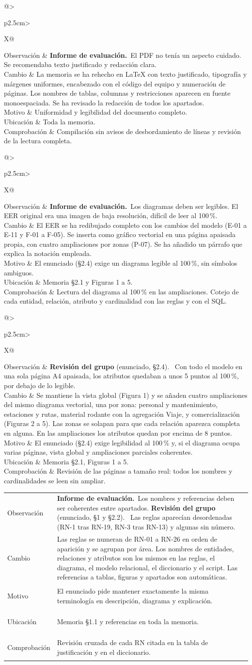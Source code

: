 \documentclass[11pt,a4paper]{article}
\makeatletter
\DeclareRobustCommand{\_}{\textunderscore\allowbreak}
\newcommand{\INF}{\textbf{Informe de evaluación.}~}
\newcommand{\REV}[1]{\textbf{Revisión del grupo} (enunciado, #1).~}
\newcommand{\cambio}[7]{%
\begin{tcolorbox}[colback=white,colframe=azuluvigo,colbacktitle=azuluvigo!8,coltitle=azuluvigo,
  title={\textbf{#1}\quad #2},fonttitle=\normalsize,boxrule=0.6pt,arc=1mm,
  left=2mm,right=2mm,top=1mm,bottom=1mm,before skip=6pt,after skip=6pt]
\small
\begin{tabularx}{\linewidth}{@{}>{\bfseries\raggedright\arraybackslash}p{2.5cm}>{\raggedright\arraybackslash}X@{}}
Observación & #3\\
Cambio & #4\\
Motivo & #5\\
Ubicación & #6\\
Comprobación & #7\\
\end{tabularx}
\end{tcolorbox}}
\makeatother
\begin{document}
\cambio{P-04}{Maquetación y redacción}
{\INF El PDF no tenía un aspecto cuidado. Se recomendaba texto justificado y redacción clara.}
{La memoria se ha rehecho en LaTeX con texto justificado, tipografía y márgenes uniformes, encabezado con el código del equipo y numeración de páginas. Los nombres de tablas, columnas y restricciones aparecen en fuente monoespaciada. Se ha revisado la redacción de todos los apartados.}
{Uniformidad y legibilidad del documento completo.}
{Toda la memoria.}
{Compilación sin avisos de desbordamiento de líneas y revisión de la lectura completa.}

\cambio{P-05}{Diagrama EER legible}
{\INF Los diagramas deben ser legibles. El EER original era una imagen de baja resolución, difícil de leer al 100\,\%.}
{El EER se ha redibujado completo con los cambios del modelo (E-01 a E-11 y F-01 a F-05). Se inserta como gráfico vectorial en una página apaisada propia, con cuatro ampliaciones por zonas (P-07). Se ha añadido un párrafo que explica la notación empleada.}
{El enunciado (§2.4) exige un diagrama legible al 100\,\%, sin símbolos ambiguos.}
{Memoria §2.1 y Figuras 1 a 5.}
{Lectura del diagrama al 100\,\% en las ampliaciones. Cotejo de cada entidad, relación, atributo y cardinalidad con las reglas y con el SQL.}

\cambio{P-07}{Ampliaciones del EER}
{\REV{§2.4} Con todo el modelo en una sola página A4 apaisada, los atributos quedaban a unos 5 puntos al 100\,\%, por debajo de lo legible.}
{Se mantiene la vista global (Figura 1) y se añaden cuatro ampliaciones del mismo diagrama vectorial, una por zona: personal y mantenimiento, estaciones y rutas, material rodante con la agregación Viaje, y comercialización (Figuras 2 a 5). Las zonas se solapan para que cada relación aparezca completa en alguna. En las ampliaciones los atributos quedan por encima de 8 puntos.}
{El enunciado (§2.4) exige legibilidad al 100\,\% y, si el diagrama ocupa varias páginas, vista global y ampliaciones parciales coherentes.}
{Memoria §2.1, Figuras 1 a 5.}
{Revisión de las páginas a tamaño real: todos los nombres y cardinalidades se leen sin ampliar.}

\cambio{P-06}{Numeración y terminología coherentes}
{\INF Los nombres y referencias deben ser coherentes entre apartados. \REV{§1 y §2.2} Las reglas aparecían desordenadas (RN-1 tras RN-19, RN-3 tras RN-13) y algunas sin número.}
{Las reglas se numeran de RN-01 a RN-26 en orden de aparición y se agrupan por área. Los nombres de entidades, relaciones y atributos son los mismos en las reglas, el diagrama, el modelo relacional, el diccionario y el script. Las referencias a tablas, figuras y apartados son automáticas.}
{El enunciado pide mantener exactamente la misma terminología en descripción, diagrama y explicación.}
{Memoria §1.1 y referencias en toda la memoria.}
{Revisión cruzada de cada RN citada en la tabla de justificación y en el diccionario.}
\end{document}
